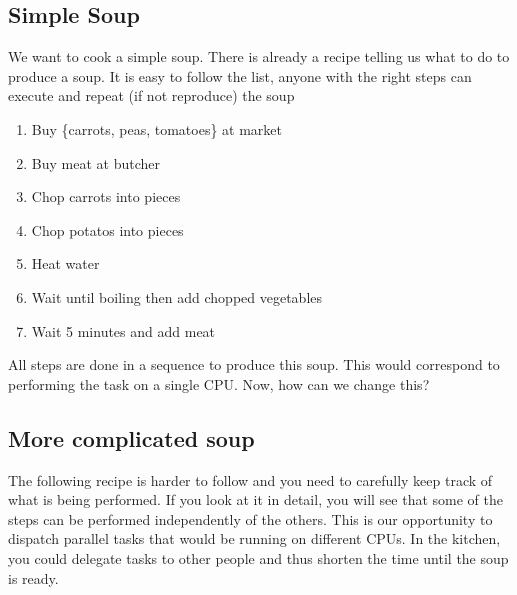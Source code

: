 \documentclass[letterpaper,10pt,english]{sphinxmanual}
\begin{document}
\subsection{Simple Soup}
\label{\detokenize{01-Introduction:simple-soup}}
\sphinxAtStartPar
We want to cook a simple soup. There is already a recipe telling us what to do to produce a soup. It is easy to follow the list, anyone with the right steps can execute and repeat (if not reproduce) the soup
\begin{enumerate}
%
\item {} 
\sphinxAtStartPar
Buy \{carrots, peas, tomatoes\} at market

\item {} 
\sphinxAtStartPar
{} Buy meat at butcher

\item {} 
\sphinxAtStartPar
{} Chop carrots into pieces

\item {} 
\sphinxAtStartPar
{} Chop potatos into pieces

\item {} 
\sphinxAtStartPar
{} Heat water

\item {} 
\sphinxAtStartPar
{} Wait until boiling then add chopped vegetables

\item {} 
\sphinxAtStartPar
{} Wait 5 minutes and add meat

\end{enumerate}

\sphinxAtStartPar
All steps are done in a sequence to produce this soup. This would correspond to performing the task on a single CPU. Now, how can we change this?


\subsection{More complicated soup}
\label{\detokenize{01-Introduction:more-complicated-soup}}
\sphinxAtStartPar
The following recipe is harder to follow and you need to carefully keep track of what is being performed. If you look at it in detail, you will see that some of the steps can be performed independently of the others. This is our opportunity to dispatch parallel tasks that would be running on different CPUs. In the kitchen, you could delegate tasks to other people and thus shorten the time until the soup is ready.
\end{document}
